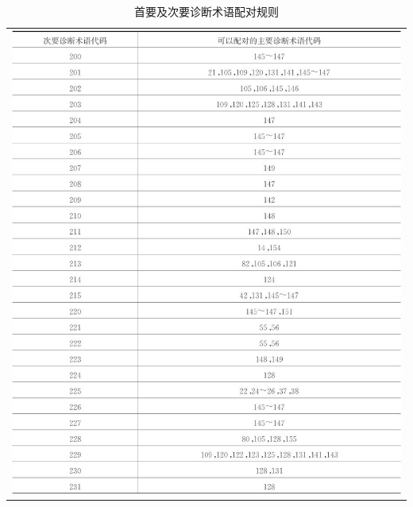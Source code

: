 \begin{longtable}{c}
  \caption{首要及次要诊断术语配对规则}
  \label{tab48-6}\\
  \endfirsthead
  \caption[]{首要及次要诊断术语配对规则}
  \endhead
\includegraphics[width=\textwidth,height=\textheight,keepaspectratio]{./images/Image00755.jpg}
\end{longtable}


